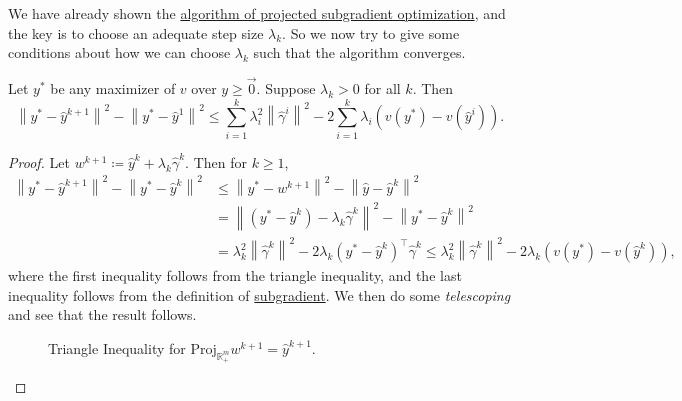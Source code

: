 \begin{prev}
	We have already shown the \hyperref[algo:projected-subgradient-optimization-algorithm]{algorithm of projected subgradient optimization}, and the key is to choose an adequate
	step size \(\lambda_{k}\). So we now try to give some conditions about how we can choose \(\lambda_{k}\) such
	that the algorithm converges.
\end{prev}

\begin{lemma}\label{lma:lec20-1}
	Let \(y^{\ast}\) be any maximizer of \(v\) over \(y\geq \vec{0}\). Suppose \(\lambda_{k}>0\) for all \(k\). Then
	\[
		\left\lVert y^{\ast} - \hat{y}^{k+1}\right\rVert^2 - \left\lVert y^{\ast} - \hat{y}^1\right\rVert^2 \leq \sum\limits_{i=1}^{k} \lambda_{i}^{2}\left\lVert \hat{\gamma}^i\right\rVert^2 - 2 \sum\limits_{i=1}^{k} \lambda_{i}\left(v(y^{\ast}) - v(\hat{y}^i)\right).
	\]
\end{lemma}
\begin{proof}
	Let \(w^{k+1} \coloneqq \hat{y}^k + \lambda_{k}\hat{\gamma}^k\). Then for \(k\geq 1\),
	\[
		\begin{split}
			\left\lVert y^{\ast} - \hat{y}^{k+1}\right\rVert^2 - \left\lVert y^{\ast} - \hat{y}^k\right\rVert^2 &\leq \left\lVert y^{\ast} - w^{k+1}\right\rVert^2 - \left\lVert \hat{y} - \hat{y}^k\right\rVert^2\\
			&= \left\lVert (y^{\ast} - \hat{y}^k) - \lambda_{k}\hat{\gamma}^k\right\rVert^2 - \left\lVert y^{\ast} - \hat{y}^k\right\rVert^2\\
			&= \lambda_{k}^{2}\left\lVert \hat{\gamma}^k\right\rVert^2 - 2\lambda_{k}(y^{\ast} - \hat{y}^k)^{\top}\hat{\gamma}^k
			\leq \lambda_{k}^{2}\left\lVert \hat{\gamma}^k\right\rVert^2 - 2\lambda_{k}(v(y^{\ast}) - v(\hat{y}^k)),
		\end{split}
	\]
	where the first inequality follows from the triangle inequality, and the last inequality follows from the definition of
	\hyperref[def:subgradient]{subgradient}. We then do some \emph{telescoping} and see that the result follows.
	\begin{figure}[H]
		\centering
		\caption{Triangle Inequality for \(\mathrm{Proj}_{\mathbb{R}^m_+}w^{k+1} = \hat{y}^{k+1}\).}
		\label{fig:maximizer-lemma-triangle-inequality}
	\end{figure}
\end{proof}


